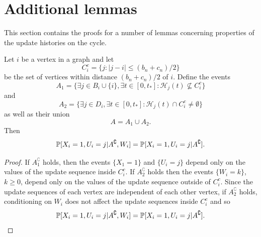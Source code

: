 	\section{Additional lemmas}
	\label{sec:additional lemmas 1D}
	This section contains the proofs for a number of lemmas concerning properties of the update histories on the cycle.

	\begin{lemma}
	\label{lem:conditioning on A removes conditioning on W}
		Let $i$ be a vertex in a graph and let
		\begin{equation}
			C_i^c = \{j : |j - i| \leq (b_n + c_n)/2\}
		\end{equation}
		be the set of vertices within distance $(b_n + c_n)/2$ of $i$. Define the events
		\begin{equation}
			A_1 = \{\exists j \in B_i \cup \{i\}, \exists t \in [0, t_*] : \mathcal{H}_j(t) \nsubseteq  C_i^c\}
		\end{equation}
		and
		\begin{equation}
			A_2 = \{\exists j \in D_i, \exists t \in [0, t_*] : \mathcal{H}_j(t) \cap C_i^c \neq \emptyset\}
		\end{equation}
		as well as their union
		\begin{equation}
			A = A_1 \cup A_2.
		\end{equation}
		Then
		\begin{equation}
			\mathbb{P}[X_i = 1, U_i = j | A^\complement, W_i] = \mathbb{P}[X_i = 1, U_i = j | A^\complement].
		\end{equation}
	\end{lemma}
	\begin{proof}
		If $A_1^\complement$ holds, then the events $\{X_1 = 1\}$ and $\{U_i = j\}$ depend only on the values of the update sequence inside $C_i^c$. If $A_2^\complement$ holds then the events $\{W_i = k\}$, $k \geq 0$, depend only on the values of the update sequence outside of $C_i^c$. Since the update sequences of each vertex are independent of each other vertex, if $A_2^\complement$ holds, conditioning on $W_i$ does not affect the update sequences inside $C_i^c$ and so 
		\begin{equation}
			\mathbb{P}[X_i = 1, U_i = j | A^\complement, W_i] = \mathbb{P}[X_i = 1, U_i = j | A^\complement].
		\end{equation}
	\end{proof}

